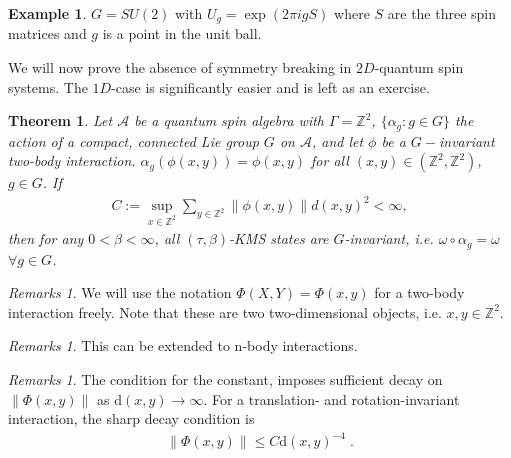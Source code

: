 \documentclass[
a4paper, %
11pt, %
onecolumn, %
openany, %
]{memoir}
\theoremstyle{definition}
\newtheorem{example}[definition]{Example}
\theoremstyle{remark}
\newtheorem{remarks}[definition]{Remarks}
\theoremstyle{plain}
\newtheorem{theorem}[definition]{Theorem}
\begin{document}
\begin{example}
$G=SU(2)$ with $U_g=\exp(2\pi i g S)$ where $S$ are the three spin matrices and $g$ is a point in the unit ball.
\end{example}
We will now prove the absence of symmetry breaking in $2D$-quantum spin systems. The $1D$-case is significantly easier and is left as an exercise.
\begin{theorem}
Let $\mathcal{A}$ be a quantum spin algebra with $\Gamma=\mathbb{Z}^2$, $\{\alpha_g:g\in G\}$ the action of a compact, connected Lie group $G$ on $\mathcal{A}$, and let $\phi$ be a $G-$invariant two-body interaction. $\alpha_g(\phi(x,y))=\phi(x,y)$ for all $(x,y)\in(\mathbb{Z}^2,\mathbb{Z}^2)$, $g\in G$. If \begin{align}
C:=\sup_{x\in\mathbb{Z}^2}\sum_{y\in\mathbb{Z}^2}\|\phi(x,y)\| d(x,y)^2<\infty,
\end{align}
then for any $0<\beta<\infty$, all $(\tau,\beta)$-KMS states are $G$-invariant, i.e. $\omega\circ\alpha_g=\omega$ $\forall g\in G$.
\end{theorem}
\begin{remarks}
We will use the notation $\Phi(X,Y)=\Phi({x,y})$ for a two-body interaction freely. Note that these are two two-dimensional objects, i.e. $x,y\in\mathbb{Z}^2$.
\end{remarks}
\begin{remarks}
This can be extended to n-body interactions.
\end{remarks}
\begin{remarks}
The condition for the constant, imposes sufficient decay on $\|\Phi(x,y)\|$ as $\mathrm{d}(x,y)\rightarrow\infty$. For a translation- and rotation-invariant interaction, the sharp decay condition is\begin{align}
\|\Phi(x,y)\|\leq C\mathrm{d}(x,y)^{-4}\; .
\end{align}
\end{remarks}
\end{document}
